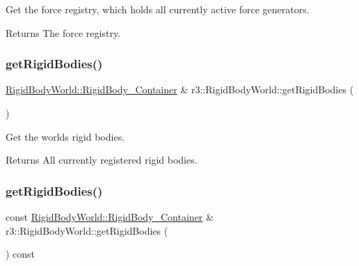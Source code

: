 Get the force registry, which holds all currently active force generators. 

\begin{DoxyReturn}{Returns}
The force registry. 
\end{DoxyReturn}
\mbox{\label{classr3_1_1_rigid_body_world_a31e9a0ddd26c25327aa21b3460c52893}} 
\subsubsection{\texorpdfstring{get\+Rigid\+Bodies()}{getRigidBodies()}\hspace{0.1cm}{\footnotesize\ttfamily [1/2]}}
{\footnotesize\ttfamily \mbox{\hyperlink{classr3_1_1_rigid_body_world_abe8c123eee198b6f8eca079e71302bcb}{Rigid\+Body\+World\+::\+Rigid\+Body\+\_\+\+Container}} \& r3\+::\+Rigid\+Body\+World\+::get\+Rigid\+Bodies (\begin{DoxyParamCaption}{ }\end{DoxyParamCaption})}



Get the world\textquotesingle{}s rigid bodies. 

\begin{DoxyReturn}{Returns}
All currently registered rigid bodies. 
\end{DoxyReturn}
\mbox{\label{classr3_1_1_rigid_body_world_abf3bfd4b5d7ed2e843362e555b9eebb2}} 
\subsubsection{\texorpdfstring{get\+Rigid\+Bodies()}{getRigidBodies()}\hspace{0.1cm}{\footnotesize\ttfamily [2/2]}}
{\footnotesize\ttfamily const \mbox{\hyperlink{classr3_1_1_rigid_body_world_abe8c123eee198b6f8eca079e71302bcb}{Rigid\+Body\+World\+::\+Rigid\+Body\+\_\+\+Container}} \& r3\+::\+Rigid\+Body\+World\+::get\+Rigid\+Bodies (\begin{DoxyParamCaption}{ }\end{DoxyParamCaption}) const}



